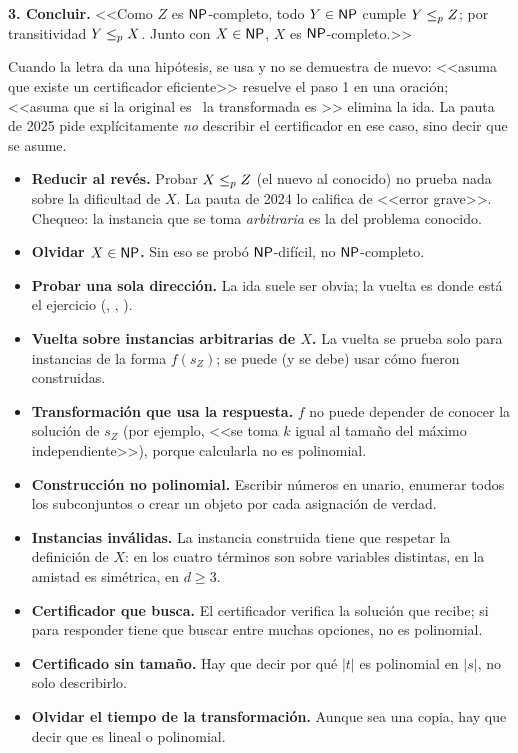 \begin{receta}
\textbf{3. Concluir.} <<Como $Z$ es $\mathsf{NP}$-completo, todo $Y\in\mathsf{NP}$ cumple $Y\le_{p} Z$; por transitividad $Y\le_{p} X$. Junto con $X\in\mathsf{NP}$, $X$ es $\mathsf{NP}$-completo.>>
\end{receta}

Cuando la letra da una hipótesis, se usa y no se demuestra de nuevo: <<asuma que existe un certificador eficiente>> resuelve el paso 1 en una oración; <<asuma que si la original es \npsi\ la transformada es \npsi>> elimina la ida. La pauta de 2025 pide explícitamente \emph{no} describir el certificador en ese caso, sino decir que se asume.

\begin{trampa}
\begin{itemize}
  \item \textbf{Reducir al revés.} Probar $X\le_{p} Z$ (el nuevo al conocido) no prueba nada sobre la dificultad de $X$. La pauta de 2024 lo califica de <<error grave>>. Chequeo: la instancia que se toma \emph{arbitraria} es la del problema conocido.
  \item \textbf{Olvidar $X\in\mathsf{NP}$.} Sin eso se probó $\mathsf{NP}$-difícil, no $\mathsf{NP}$-completo.
  \item \textbf{Probar una sola dirección.} La ida suele ser obvia; la vuelta es donde está el ejercicio (, , ).
  \item \textbf{Vuelta sobre instancias arbitrarias de $X$.} La vuelta se prueba solo para instancias de la forma $f(s_Z)$; se puede (y se debe) usar cómo fueron construidas.
  \item \textbf{Transformación que usa la respuesta.} $f$ no puede depender de conocer la solución de $s_Z$ (por ejemplo, <<se toma $k$ igual al tamaño del máximo independiente>>), porque calcularla no es polinomial.
  \item \textbf{Construcción no polinomial.} Escribir números en unario, enumerar todos los subconjuntos o crear un objeto por cada asignación de verdad.
  \item \textbf{Instancias inválidas.} La instancia construida tiene que respetar la definición de $X$: en  los cuatro términos son sobre variables distintas, en  la amistad es simétrica, en  $d\ge 3$.
  \item \textbf{Certificador que busca.} El certificador verifica la solución que recibe; si para responder tiene que buscar entre muchas opciones, no es polinomial.
  \item \textbf{Certificado sin tamaño.} Hay que decir por qué $|t|$ es polinomial en $|s|$, no solo describirlo.
  \item \textbf{Olvidar el tiempo de la transformación.} Aunque sea una copia, hay que decir que es lineal o polinomial.
\end{itemize}
\end{trampa}

